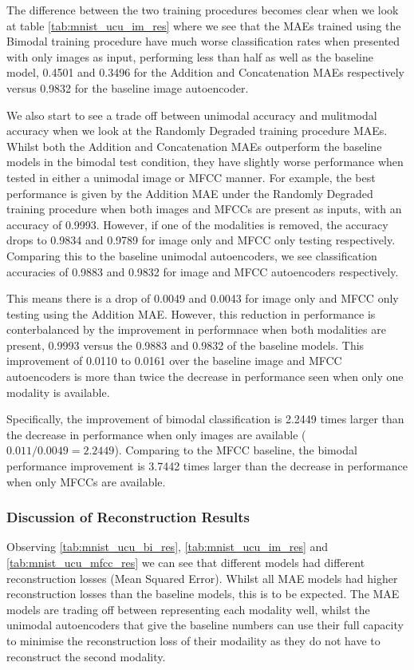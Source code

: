 The difference between the two training procedures becomes clear when we look at table \autoref{tab:mnist_ucu_im_res} where we see that the MAEs trained using the Bimodal training procedure have much worse classification rates when presented with only images as input, performing less than half as well as the baseline model, 0.4501 and 0.3496 for the Addition and Concatenation MAEs respectively versus 0.9832 for the baseline image autoencoder.

We also start to see a trade off between unimodal accuracy and mulitmodal accuracy when we look at the Randomly Degraded training procedure MAEs. Whilst both the Addition and Concatenation MAEs outperform the baseline models in the bimodal test condition, they have slightly worse performance when tested in either a unimodal image or MFCC manner. For example, the best performance is given by the Addition MAE under the Randomly Degraded training procedure when both images and MFCCs are present as inputs, with an accuracy of 0.9993. However, if one of the modalities is removed, the accuracy drops to 0.9834 and 0.9789 for image only and MFCC only testing respectively. Comparing this to the baseline unimodal autoencoders, we see classification accuracies of 0.9883 and 0.9832 for image and MFCC autoencoders respectively. 

This means there is a drop of 0.0049 and 0.0043 for image only and MFCC only testing using the Addition MAE. However, this reduction in performance is conterbalanced by the improvement in performnace when both modalities are present, 0.9993 versus the 0.9883 and 0.9832 of the baseline models. This improvement of 0.0110 to 0.0161 over the baseline image and MFCC autoencoders is more than twice the decrease in performance seen when only one modality is available. 

Specifically, the improvement of bimodal classification is 2.2449 times larger than the decrease in performance when only images are available ($0.011 / 0.0049 = 2.2449$). Comparing to the MFCC baseline, the bimodal performance improvement is 3.7442 times larger than the decrease in performance when only MFCCs are available.

\subsubsection{Discussion of Reconstruction Results}
Observing \autoref{tab:mnist_ucu_bi_res}, \autoref{tab:mnist_ucu_im_res} and \autoref{tab:mnist_ucu_mfcc_res} we can see that different models had different reconstruction losses (Mean Squared Error). Whilst all MAE models had higher reconstruction losses than the baseline models, this is to be expected. The MAE models are trading off between representing each modality well, whilst the unimodal autoencoders that give the baseline numbers can use their full capacity to minimise the reconstruction loss of their modaility as they do not have to reconstruct the second modality. 

